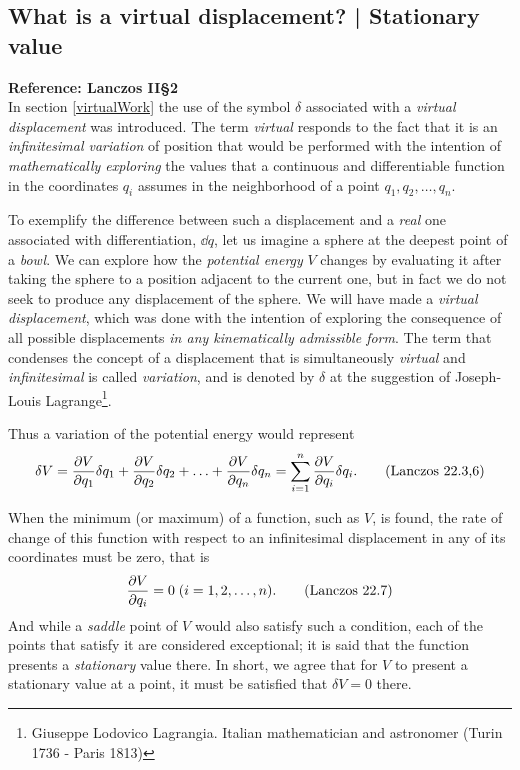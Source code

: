 \documentclass[12pt, english, a4paper]{article}
\begin{document}
\subsection{What is a virtual displacement? | Stationary value}\label{virtualDisplacement}
\textbf{Reference: Lanczos II\S2}\\

In section \ref{virtualWork} the use of the symbol \(\delta\) associated with a \emph{virtual displacement} was introduced.
The term \emph{virtual} responds to the fact that it is an \emph{infinitesimal variation} of position that would be performed with the intention of \emph{mathematically exploring} the values that a continuous and differentiable function in the coordinates \(q_i\) assumes in the neighborhood of a point \(q_1, q_2, \ldots, q_n\).

To exemplify the difference between such a displacement and a \emph{real} one associated with differentiation, \(\dd q\), let us imagine a sphere at the deepest point of a \emph{bowl}.
We can explore how the \emph{potential energy} \(V\) changes by evaluating it after taking the sphere to a position adjacent to the current one, but in fact we do not seek to produce any displacement of the sphere.
We will have made a \emph{virtual displacement}, which was done with the intention of exploring the consequence of all possible displacements \emph{in any kinematically admissible form}.
The term that condenses the concept of a displacement that is simultaneously \emph{virtual} and \emph{infinitesimal} is called \emph{variation}, and is denoted by \(\delta\) at the suggestion of Joseph-Louis Lagrange\footnote{Giuseppe Lodovico Lagrangia. Italian mathematician and astronomer (Turin 1736 - Paris 1813)}.

Thus a variation of the potential energy would represent
\begin{equation}\label{Lanczos22.3,6}
    \delta V = 
	\pdv{V}{q_1} \delta q_1+ \pdv{V}{q_2} \delta q_2+ \ldots + \pdv{V}{q_n} \delta q_n =
	\sum^{n}_{i=1} \pdv{V}{q_i} \delta q_i.
    \tag{Lanczos 22.3,6}
\end{equation}

When the minimum (or maximum) of a function, such as \(V\), is found, the rate of change of this function with respect to an infinitesimal displacement in any of its coordinates must be zero, that is
\begin{equation}\label{Lanczos22.7}
	\pdv{V}{q_i} = 0\; (i= 1, 2, \ldots, n).
    \tag{Lanczos 22.7}
\end{equation}
And while a \emph{saddle} point of \(V\) would also satisfy such a condition, each of the points that satisfy it are considered exceptional; it is said that the function presents a \emph{stationary} value there.
In short, we agree that for \(V\) to present a stationary value at a point, it must be satisfied that \(\delta V=0\) there.
\end{document}
